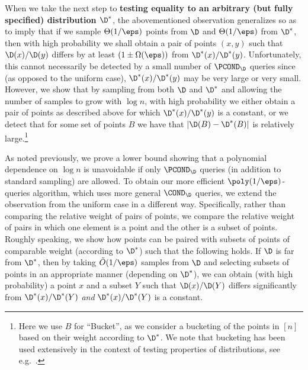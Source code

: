 When we take the next step to {\bf testing equality  to an arbitrary (but
fully specified) distribution $\D^\ast$}, the abovementioned observation
generalizes so as to imply that if we sample $\Theta(1/\eps)$ points
from $\D$ and $\Theta(1/\eps)$ from $\D^\ast$, then with high probability
we shall obtain a pair of points $(x,y)$ such that  $\D(x)/\D(y)$
differs by at least $(1\pm \Omega(\eps))$ from $\D^\ast(x)/\D^\ast(y)$.
Unfortunately, this cannot necessarily be detected by a small number
of $\PCOND_\D$ queries since (as opposed to the uniform case), $\D^\ast(x)/\D^\ast(y)$
may be very large or very small. However, we show that by sampling from both
$\D$ and $\D^\ast$ and allowing the number of samples to grow with $\log n$, with
high probability we either obtain a pair of points as described above
for which  $\D^\ast(x)/\D^\ast(y)$ is a constant, or we detect that for
some set of points $B$ we have that  $|\D(B) - \D^\ast(B)|$ is relatively
large.\footnote{Here we use $B$ for ``Bucket'', as we consider a bucketing of the points in
$[n]$ based on their weight according to $\D^\ast$. We note that bucketing has
been used extensively in the context of testing properties of distributions,
see e.g.~\cite{BFRSW:10,BFFKRW:01}.}

As noted previously, {we prove a lower bound showing that}
a polynomial dependence on $\log n$ is unavoidable if only
$\PCOND_\D$ queries (in addition to standard sampling) are allowed. To obtain
our more efficient $\poly(1/\eps)$-queries algorithm, which uses more general
$\COND_\D$ queries, we extend the observation from
the uniform case in a different
way. Specifically, rather than comparing the relative weight of
pairs of points, we compare the relative weight of pairs in which
{one element is a point and the other is a subset of points.}
Roughly speaking, we show how points can be paired with subsets of points of
comparable weight (according to $\D^\ast$)
 such that the following holds. If $\D$ is far from $\D^\ast$, then
by taking $\tilde{O}(1/\eps)$ samples from $\D$ and selecting subsets of
points in an appropriate manner
(depending on  $\D^\ast$), we can obtain (with high probability) a point $x$
and a subset $Y$ such that $\D(x)/\D(Y)$ differs significantly from
$\D^\ast(x)/\D^\ast(Y)$ \emph{and} $\D^\ast(x)/\D^\ast(Y)$ is a constant.


